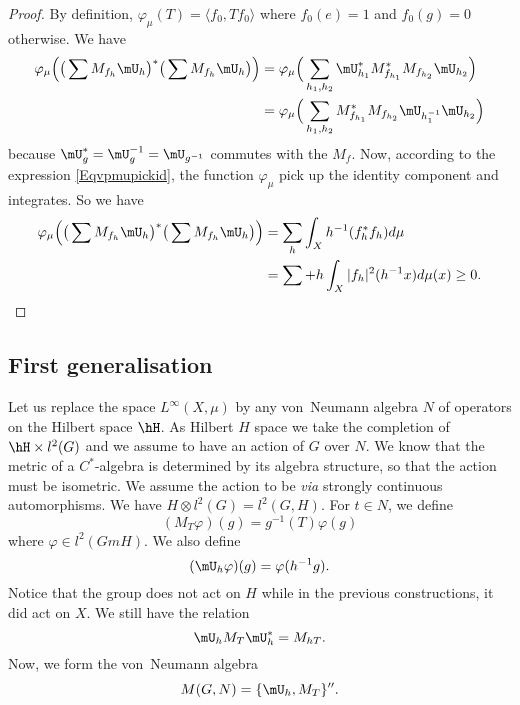 \begin{proof}
	By definition, $\varphi_{\mu}(T)=\langle f_0, Tf_0\rangle $ where $f_0(e)=1$ and $f_0(g)=0$ otherwise. We have
	\begin{align*}
		\varphi_{\mu}\Big( \big( \sum M_{f_h}\mU_h \big)^*\big( \sum M_{f_h}\mU_h \big) \Big) & =\varphi_{\mu}\Big( \sum_{h_1,h_2}\mU_{h_1}^*M_{f_{h_1}}^*M_{f_{h_2}} \mU_{h_2} \Big)     \\
		                                                                                      & =\varphi_{\mu}\Big( \sum_{h_1,h_2}  M_{f_{h_1}}^*M_{f_{h_2}}\mU_{h_1^{-1}}\mU_{h_2} \Big)
	\end{align*}
	because $\mU_g^*=\mU_g^{-1}=\mU_{g^{-1}}$ commutes with the $M_f$. Now, according to the expression \eqref{Eqvpmupickid}, the function $\varphi_{\mu}$ pick up the identity component and integrates. So we have
	\begin{align*}
		\varphi_{\mu}\Big( \big( \sum M_{f_h}\mU_h \big)^*\big( \sum M_{f_h}\mU_h \big) \Big) & =\sum_{h}\int_X h^{-1}(f^*_hf_h)d\mu         \\
		                                                                                      & =\sum+h\int_X| f_h |^2(h^{-1}x)d\mu(x)\geq0.
	\end{align*}

\end{proof}

\subsection{First generalisation}

Let us replace the space $ L^{\infty}(X,\mu)$ by any von~Neumann algebra $N$ of operators on the Hilbert space $\hH$. As Hilbert $H$ space we take the completion of $\hH\times l^2(G)$ and we assume to have an action of $G$ over $N$. We know that the metric of a $C^*$-algebra is determined by its algebra structure, so that the action must be isometric. We assume the action to be \emph{via} strongly continuous automorphisms. We have $H\otimes l^2(G)=l^2(G,H)$. For $t\in N$, we define
\[
	(M_T\varphi)(g)=g^{-1}(T)\varphi(g)
\]
where $\varphi\in l^2(GmH)$. We also define
\[
	(\mU_h\varphi)(g)=\varphi(h^{-1}g).
\]
Notice that the group does not act on $H$ while in the previous constructions, it did act on $X$. We still have the relation
\begin{equation}
	\mU_hM_T\mU_h^*=M_{hT}.
\end{equation}
Now, we form the von~Neumann algebra
\begin{equation}
	M(G,N)=\{ \mU_h,M_T \}''.
\end{equation}

